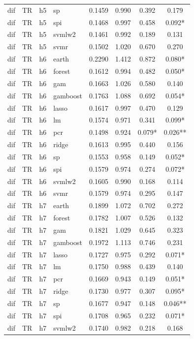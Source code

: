 \begin{ThreePartTable}
\begin{longtable}[t]{llclcccc}
dif & TR & h5 & sp & 0.1459 & 0.990 & 0.392 & 0.179\\
dif & TR & h5 & spi & 0.1468 & 0.997 & 0.458 & 0.092*\\
dif & TR & h5 & svmlw2 & 0.1461 & 0.992 & 0.189 & 0.131\\
dif & TR & h5 & svmr & 0.1502 & 1.020 & 0.670 & 0.270\\
\addlinespace
dif & TR & h6 & earth & 0.2290 & 1.412 & 0.872 & 0.080*\\
dif & TR & h6 & forest & 0.1612 & 0.994 & 0.482 & 0.050*\\
dif & TR & h6 & gam & 0.1663 & 1.026 & 0.580 & 0.140\\
dif & TR & h6 & gamboost & 0.1763 & 1.088 & 0.692 & 0.054*\\
dif & TR & h6 & lasso & 0.1617 & 0.997 & 0.470 & 0.129\\
dif & TR & h6 & lm & 0.1574 & 0.971 & 0.341 & 0.099*\\
dif & TR & h6 & pcr & 0.1498 & 0.924 & 0.079* & 0.026**\\
dif & TR & h6 & ridge & 0.1613 & 0.995 & 0.440 & 0.156\\
dif & TR & h6 & sp & 0.1553 & 0.958 & 0.149 & 0.052*\\
dif & TR & h6 & spi & 0.1579 & 0.974 & 0.274 & 0.072*\\
dif & TR & h6 & svmlw2 & 0.1605 & 0.990 & 0.168 & 0.114\\
dif & TR & h6 & svmr & 0.1579 & 0.974 & 0.295 & 0.147\\
\addlinespace
dif & TR & h7 & earth & 0.1899 & 1.072 & 0.702 & 0.272\\
dif & TR & h7 & forest & 0.1782 & 1.007 & 0.526 & 0.132\\
dif & TR & h7 & gam & 0.1821 & 1.029 & 0.645 & 0.323\\
dif & TR & h7 & gamboost & 0.1972 & 1.113 & 0.746 & 0.231\\
dif & TR & h7 & lasso & 0.1727 & 0.975 & 0.292 & 0.071*\\
dif & TR & h7 & lm & 0.1750 & 0.988 & 0.439 & 0.140\\
dif & TR & h7 & pcr & 0.1669 & 0.943 & 0.149 & 0.051*\\
dif & TR & h7 & ridge & 0.1730 & 0.977 & 0.307 & 0.095*\\
dif & TR & h7 & sp & 0.1677 & 0.947 & 0.148 & 0.046**\\
dif & TR & h7 & spi & 0.1708 & 0.965 & 0.232 & 0.071*\\
dif & TR & h7 & svmlw2 & 0.1740 & 0.982 & 0.218 & 0.168\\

\end{longtable}
\end{ThreePartTable}
